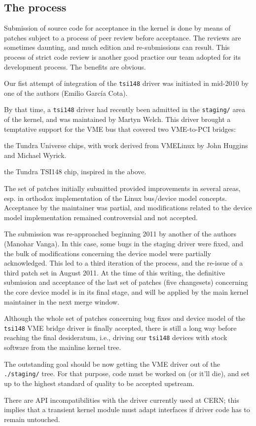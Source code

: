 \documentclass{JAC2003}
\begin{document}
\subsection{The process}

Submission of source code for acceptance in the kernel is done by means
of patches subject to a process of peer review before acceptance. The
reviews are sometimes daunting, and much edition and re-submissions can
result. This process of strict code review is another good practice our
team adopted for its development process. The benefits are obvious.

Our fist attempt of integration of the \verb|tsi148| driver
was initiated in mid-2010 by one of the authors (Emilio Garc\'ia
Cota). 

By that time, a \verb|tsi148| driver had recently been admitted in the
\texttt{staging/} area of the kernel, and was maintained by Martyn Welch. This
driver brought a temptative support for the VME bus that covered
two VME-to-PCI bridges:
\begin{Itemize}
\item the Tundra Universe chips, with work derived from VMELinux by John
Huggins and Michael Wyrick.
\item the Tundra TSI148 chip, inspired in the above.
\end{Itemize}

The set of patches initially submitted provided improvements in several
areas, esp. in orthodox implementation of the Linux bus/device model
concepts.
Acceptance by the maintainer was partial, and modifications related to
the device model implementation remained controversial and not accepted.

The submission was re-approached beginning 2011 by another of the
authors (Manohar Vanga). In this case, some bugs in the staging driver
were fixed, and the bulk of modifications concerning the device model
were partially acknowledged. This led to a third iteration of the
process, and the re-issue of a third patch set in August 2011. At the
time of this writing, the definitive submission and acceptance of the
last set of patches (five changesets) concerning the core device model
is in its final stage, and will be applied by the main kernel maintainer
in the next merge window.

Although the whole set of patches concerning bug
fixes and device model of the \verb|tsi148| VME bridge driver is
finally accepted, there is still a long way before reaching
the final desideratum, i.e., driving our \verb|tsi148| devices
with stock software from the mainline kernel tree.
\begin{Itemize}
\item The outstanding goal should be now getting the VME driver out
of the \verb|./staging/| tree. For that purpose, code must be worked on
(or it'll die), and set up to the highest standard of quality to be
accepted upstream.
\item There are API  incompatibilities with the driver currently used at
CERN; this implies that a transient kernel module must adapt interfaces
if driver code has to remain untouched.
\end{Itemize}
\end{document}
